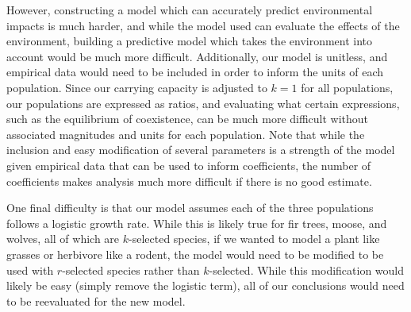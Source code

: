 \documentclass[10pt]{article}
\begin{document}
However, constructing a model which can accurately predict environmental impacts is much harder, and while the model used can evaluate the effects of the environment, building a predictive model which takes the environment into account would be much more difficult. Additionally, our model is unitless, and empirical data would need to be included in order to inform the units of each population. Since our carrying capacity is adjusted to \(k=1\) for all populations, our populations are expressed as ratios, and evaluating what certain expressions, such as the equilibrium of coexistence, can be much more difficult without associated magnitudes and units for each population. Note that while the inclusion and easy modification of several parameters is a strength of the model given empirical data that can be used to inform coefficients, the number of coefficients makes analysis much more difficult if there is no good estimate.

One final difficulty is that our model assumes each of the three populations follows a logistic growth rate. While this is likely true for fir trees, moose, and wolves, all of which are $k$-selected species, if we wanted to model a plant like grasses or herbivore like a rodent, the model would need to be modified to be used with $r$-selected species rather than $k$-selected. While this modification would likely be easy (simply remove the logistic term), all of our conclusions would need to be reevaluated for the new model.



\end{document}
